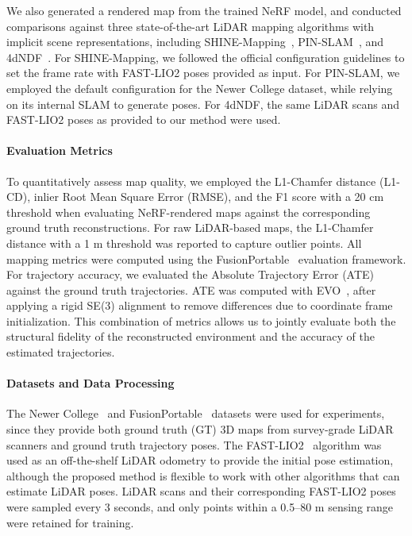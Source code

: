 We also generated a rendered map from the trained NeRF model, and conducted comparisons against three state-of-the-art LiDAR mapping algorithms with implicit scene representations, including SHINE-Mapping~\cite{zhong2023shinemapping}, PIN-SLAM~\cite{pan2024pinslam}, and 4dNDF~\cite{zhong20244dNDF}. For SHINE-Mapping, we followed the official configuration guidelines to set the frame rate with FAST-LIO2 poses provided as input. For PIN-SLAM, we employed the default configuration for the Newer College dataset, while relying on its internal SLAM to generate poses. For 4dNDF, the same LiDAR scans and FAST-LIO2 poses as provided to our method were used.

\paragraph{Evaluation Metrics}
To quantitatively assess map quality, we employed the L1-Chamfer distance (L1-CD), inlier Root Mean Square Error (RMSE), and the F1 score with a 20 cm threshold when evaluating NeRF-rendered maps against the corresponding ground truth reconstructions. For raw LiDAR-based maps, the L1-Chamfer distance with a 1 m threshold was reported to capture outlier points. All mapping metrics were computed using the FusionPortable~\cite{wei2024fusionportablev2} evaluation framework. For trajectory accuracy, we evaluated the Absolute Trajectory Error (ATE) against the ground truth trajectories. ATE was computed with EVO~\cite{grupp2017evo}, after applying a rigid SE(3) alignment to remove differences due to coordinate frame initialization. This combination of metrics allows us to jointly evaluate both the structural fidelity of the reconstructed environment and the accuracy of the estimated trajectories.

\paragraph{Datasets and Data Processing}
The Newer College~\cite{Ramezani2020newercollege} and FusionPortable~\cite{wei2024fusionportablev2} datasets were used for experiments, since they provide both ground truth (GT) 3D maps from survey-grade LiDAR scanners and ground truth trajectory poses. The FAST-LIO2~\cite{xu2021fastlio2} algorithm was used as an off-the-shelf LiDAR odometry to provide the initial pose estimation, although the proposed method is flexible to work with other algorithms that can estimate LiDAR poses. LiDAR scans and their corresponding FAST-LIO2 poses were sampled every 3 seconds, and only points within a 0.5–80 m sensing range were retained for training. 


